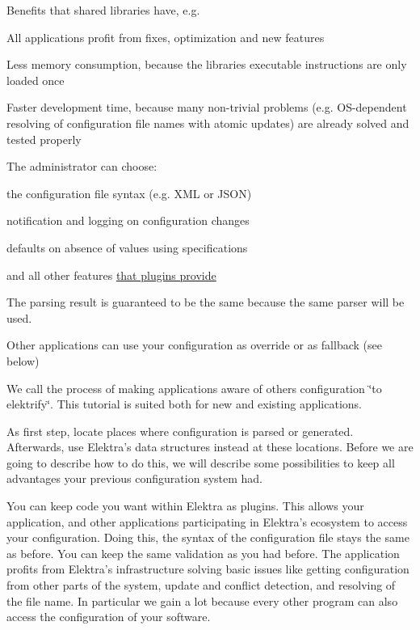 \begin{DoxyItemize}
\item Benefits that shared libraries have, e.\+g.
\begin{DoxyItemize}
\item All applications profit from fixes, optimization and new features
\item Less memory consumption, because the libraries executable instructions are only loaded once
\item Faster development time, because many non-\/trivial problems (e.\+g. O\+S-\/dependent resolving of configuration file names with atomic updates) are already solved and tested properly
\end{DoxyItemize}
\item The administrator can choose\+:
\begin{DoxyItemize}
\item the configuration file syntax (e.\+g. X\+ML or J\+S\+ON)
\item notification and logging on configuration changes
\item defaults on absence of values using specifications
\item and all other features \hyperlink{src_plugins_README_md}{that plugins provide}
\end{DoxyItemize}
\item The parsing result is guaranteed to be the same because the same parser will be used.
\item Other applications can use your configuration as override or as fallback (see below)
\end{DoxyItemize}

We call the process of making applications aware of other\textquotesingle{}s configuration \char`\"{}to elektrify\char`\"{}. This tutorial is suited both for new and existing applications.

As first step, locate places where configuration is parsed or generated. Afterwards, use Elektra’s data structures instead at these locations. Before we are going to describe how to do this, we will describe some possibilities to keep all advantages your previous configuration system had.

You can keep code you want within Elektra as plugins. This allows your application, and other applications participating in Elektra’s ecosystem to access your configuration. Doing this, the syntax of the configuration file stays the same as before. You can keep the same validation as you had before. The application profits from Elektra’s infrastructure solving basic issues like getting configuration from other parts of the system, update and conflict detection, and resolving of the file name. In particular we gain a lot because every other program can also access the configuration of your software.

